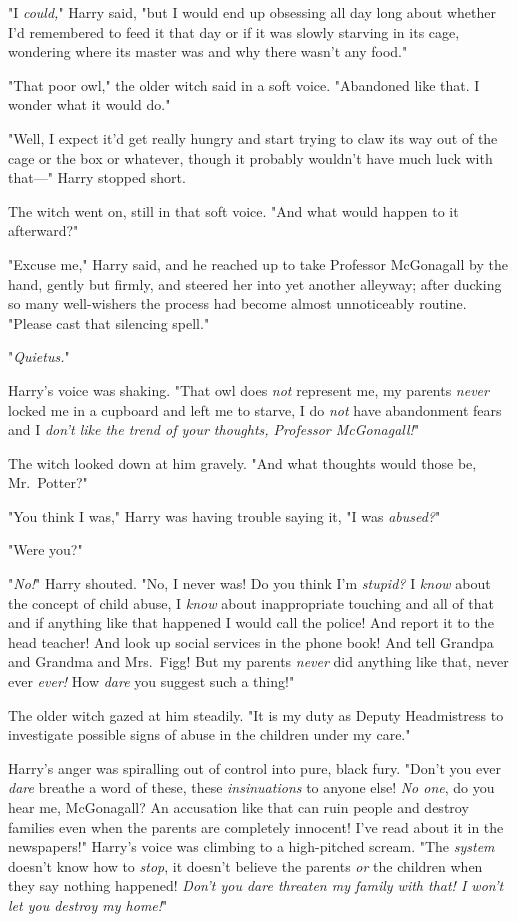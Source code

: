 "I \emph{could,}" Harry said, "but I would end up obsessing all day long about 
whether I'd remembered to feed it that day or if it was slowly starving in its 
cage, wondering where its master was and why there wasn't any food."

"That poor owl," the older witch said in a soft voice. "Abandoned like that. I 
wonder what it would do."

"Well, I expect it'd get really hungry and start trying to claw its way out of 
the cage or the box or whatever, though it probably wouldn't have much luck 
with that---" Harry stopped short.

The witch went on, still in that soft voice. "And what would happen to it 
afterward?"

"Excuse me," Harry said, and he reached up to take Professor McGonagall by the 
hand, gently but firmly, and steered her into yet another alleyway; after 
ducking so many well-wishers the process had become almost unnoticeably 
routine. "Please cast that silencing spell."

"\emph{Quietus.}"

Harry's voice was shaking. "That owl does \emph{not} represent me, my parents 
\emph{never} locked me in a cupboard and left me to starve, I do \emph{not} 
have abandonment fears and I \emph{don't like the trend of your thoughts, 
Professor McGonagall!}"

The witch looked down at him gravely. "And what thoughts would those be, 
Mr.~Potter?"

"You think I was," Harry was having trouble saying it, "I was \emph{abused?}"

"Were you?"

"\emph{No!}" Harry shouted. "No, I never was! Do you think I'm \emph{stupid?} I 
\emph{know} about the concept of child abuse, I \emph{know} about inappropriate 
touching and all of that and if anything like that happened I would call the 
police! And report it to the head teacher! And look up social services in the 
phone book! And tell Grandpa and Grandma and Mrs.~Figg! But my parents 
\emph{never} did anything like that, never ever \emph{ever!} How \emph{dare} 
you suggest such a thing!"

The older witch gazed at him steadily. "It is my duty as Deputy Headmistress to 
investigate possible signs of abuse in the children under my care."

Harry's anger was spiralling out of control into pure, black fury. "Don't you 
ever \emph{dare} breathe a word of these, these \emph{insinuations} to anyone 
else! \emph{No one}, do you hear me, McGonagall? An accusation like that can 
ruin people and destroy families even when the parents are completely innocent! 
I've read about it in the newspapers!" Harry's voice was climbing to a 
high-pitched scream. "The \emph{system} doesn't know how to \emph{stop}, it 
doesn't believe the parents \emph{or} the children when they say nothing 
happened! \emph{Don't you dare threaten my family with that! I won't let you 
destroy my home!}"

